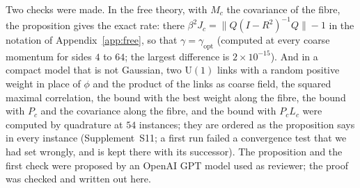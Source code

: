 Two checks were made. In the free theory, with $M_c$ the covariance of the fibre, the proposition gives the
exact rate: there $\beta^2J_c=\|Q(I-R^2)^{-1}Q\|-1$ in the notation of Appendix~\ref{app:free}, so that
$\gamma=\gamma_{\mathrm{opt}}$ (computed at every coarse momentum for sides $4$ to $64$; the largest
difference is $2\times10^{-15}$). And in a compact model that is not Gaussian, two $\mathrm U(1)$ links with
a random positive weight in place of $\phi$ and the product of the links as coarse field, the squared maximal
correlation, the bound with the best weight along the fibre, the bound with $P_c$ and the covariance along
the fibre, and the bound with $P_cL_c$ were computed by quadrature at $54$ instances; they are ordered as the
proposition says in every instance (Supplement~S11; a first run failed a convergence test that we had set
wrongly, and is kept there with its successor). The proposition and the first check were proposed by an
OpenAI GPT model used as reviewer; the proof was checked and written out here.

